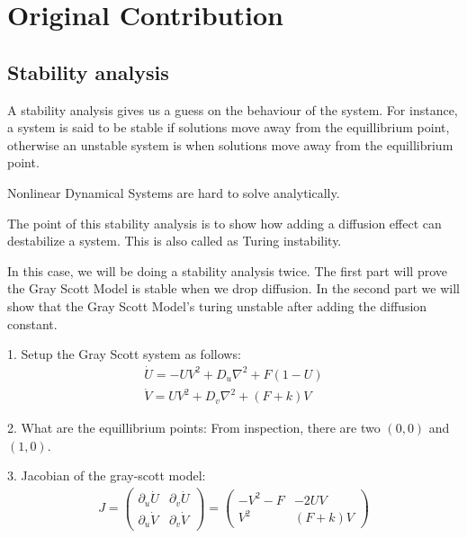\documentclass[a4paper, 11pt]{article}
\begin{document}
\section{Original Contribution}
\label{sec:simulations}

\subsection{Stability analysis}
\label{sec:stability}


A stability analysis gives us a guess on the behaviour of the system. For instance, a system is said to be stable if solutions move away from the equillibrium point, otherwise an unstable system is when solutions move away from the equillibrium point.


Nonlinear Dynamical Systems are hard to solve analytically.




The point of this stability analysis is to show how adding a diffusion effect can destabilize a system. This is also called as Turing instability.

In this case, we will be doing a stability analysis twice. The first part will prove the Gray Scott Model is stable when we drop diffusion. In the second part we will show that the Gray Scott Model's turing unstable after adding the diffusion constant.


1. Setup the Gray Scott system  as follows:
\begin{align*}
	\dot{U} = -UV^2 + D_u \nabla^2 + F(1 - U) \\
	\dot{V} = UV^2 + D_v \nabla^2 + (F + k)V
\end{align*}

2. What are the equillibrium points:
From inspection, there are two $(0, 0)$ and $(1, 0)$.

3. Jacobian of the gray-scott model:
\begin{align*}
	J = \begin{pmatrix}
		    \partial_{u} \dot{U} & \partial_v  \dot{U}  \\
		    \partial_{u} \dot{V} & \partial_{v} \dot{V}
	    \end{pmatrix}
	=
	\begin{pmatrix}
		- V^2 - F & -2UV     \\
		V^2       & (F + k)V
	\end{pmatrix}
\end{align*}
\end{document}
